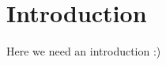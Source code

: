 
\section{Introduction}\label{label_forward}
\setcounter{page}{1}

\updatedisclaimer

Here we need an introduction :)

